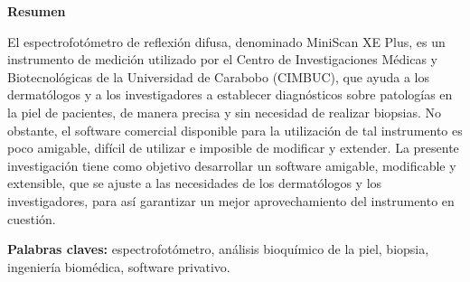 \begin{center}
	\membrete
	\vfill
	\textbf{Resumen}
\end{center}

	\noindent
El espectrofot\'{o}metro de reflexi\'{o}n difusa, denominado MiniScan XE Plus, es un instrumento de medici\'{o}n utilizado por el Centro de Investigaciones M\'{e}dicas y Biotecnol\'{o}gicas de la Universidad de Carabobo (CIMBUC), que ayuda a los dermat\'{o}logos y a los investigadores a establecer diagn\'{o}sticos sobre patolog\'{i}as en la piel de pacientes, de manera precisa y sin necesidad de realizar biopsias. No obstante, el software comercial disponible para la utilizaci\'{o}n de tal instrumento es poco amigable, dif\'{i}cil de utilizar e imposible de modificar y extender. La presente investigaci\'{o}n tiene como objetivo desarrollar un software amigable, modificable y extensible, que se ajuste a las necesidades de los dermat\'{o}logos y los investigadores, para as\'{i} garantizar un mejor aprovechamiento del instrumento en cuesti\'{o}n.

	\noindent
	\textbf{Palabras claves:} espectrofot\'{o}metro, an\'{a}lisis bioqu\'{i}mico de la piel, biopsia, ingenier\'{i}a biom\'{e}dica, software privativo.

\vfill
\begin{minipage}[t]{0.45\textwidth}
	\begin{flushleft}
		\begin{center}
			\autor
		\end{center}
	\end{flushleft}
\end{minipage}
\begin{minipage}[t]{0.45\textwidth}
	\begin{flushright}
		\begin{center}
			\tutores
		\end{center}
	\end{flushright}
\end{minipage}
\vfill